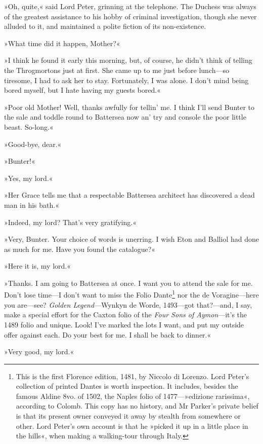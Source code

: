 »Oh, quite,« said Lord Peter, grinning at the telephone. The Duchess was always of the greatest assistance to his hobby of criminal investigation, though she never alluded to it, and maintained a polite fiction of its non-existence.

»What time did it happen, Mother?«

»I think he found it early this morning, but, of course, he didn't think of telling the Throgmortons just at first. She came up to me just before lunch—so tiresome, I had to ask her to stay. Fortunately, I was alone. I don't mind being bored myself, but I hate having my guests bored.«

»Poor old Mother! Well, thanks awfully for tellin' me. I think I'll send Bunter to the sale and toddle round to Battersea now an' try and console the poor little beast. So-long.«

»Good-bye, dear.«

»Bunter!«

»Yes, my lord.«

»Her Grace tells me that a respectable Battersea architect has discovered a dead man in his bath.«

»Indeed, my lord? That's very gratifying.«

»Very, Bunter. Your choice of words is unerring. I wish Eton and Balliol had done as much for me. Have you found the catalogue?«

»Here it is, my lord.«

»Thanks. I am going to Battersea at once. I want you to attend the sale for me. Don't lose time—I don't want to miss the Folio Dante\footnote{This is the first Florence edition, 1481, by Niccolo di Lorenzo. Lord Peter's collection of printed Dantes is worth inspection. It includes, besides the famous Aldine 8vo. of 1502, the Naples folio of 1477—»edizione rarissima«, according to Colomb. This copy has no history, and Mr Parker's private belief is that its present owner conveyed it away by stealth from somewhere or other. Lord Peter's own account is that he »picked it up in a little place in the hills«, when making a walking-tour through Italy.} nor the de Voragine—here you are—see? \textit{Golden Legend}---Wynkyn de Worde, 1493—got that?---and, I say, make a special effort for the Caxton folio of the \textit{Four Sons of Aymon}---it's the 1489 folio and unique. Look! I've marked the lots I want, and put my outside offer against each. Do your best for me. I shall be back to dinner.«

»Very good, my lord.«

